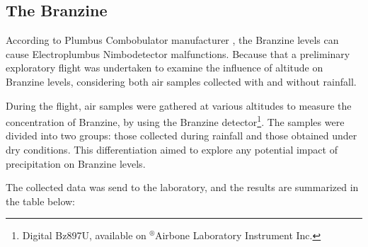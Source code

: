 \documentclass[english]{cenarticle}
\begin{document}
\subsection{The Branzine}

According to Plumbus Combobulator manufacturer \citep{PlumbusManual}, the Branzine levels can cause Electroplumbus Nimbodetector malfunctions. Because that a preliminary exploratory flight was undertaken to examine the influence of altitude on Branzine levels, considering both air samples collected with and without rainfall.

During the flight, air samples were gathered at various altitudes to measure the concentration of Branzine, by using the Branzine detector\footnote{Digital Bz897U, available on $^{\circledR}$Airbone Laboratory Instrument Inc.}. The samples were divided into two groups: those collected during rainfall and those obtained under dry conditions. This differentiation aimed to explore any potential impact of precipitation on Branzine levels.


The collected data was send to the laboratory, and the results are summarized in the table below:
\end{document}
